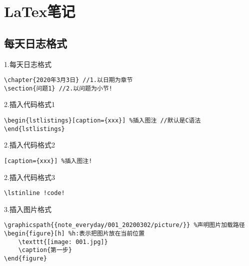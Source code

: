 \chapter{LaTex笔记}
\section{每天日志格式}


1.每天日志格式
\begin{lstlisting}[]
\chapter{2020年3月3日} //1.以日期为章节
\section{问题1} //2.以问题为小节!
\end{lstlisting}

2.插入代码格式1
\begin{lstlisting}[]
\begin{lstlistings}[caption={xxx}] %插入图注 //默认是C语法
\end{lstlistings}
\end{lstlisting}

2.插入代码格式2
\begin{lstlisting}[]
[caption={xxx}] %插入图注!
\end{lstlisting}

2.插入代码格式3
\begin{lstlisting}[]
\lstinline !code!
\end{lstlisting}

3.插入图片格式
\begin{lstlisting}[]
\graphicspath{{note_everyday/001_20200302/picture/}} %声明图片加载路径
\begin{figure}[h] %h:表示把图片放在当前位置
    \texttt{[image: 001.jpg]}
    \caption{第一步}
\end{figure}

\end{lstlisting}
